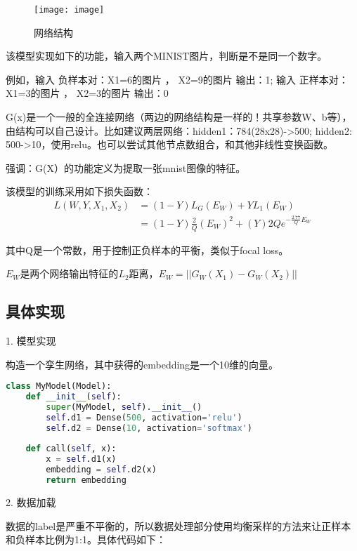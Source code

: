 \documentclass{article}
\begin{document}
		\begin{figure}[H]
			\centering
			\texttt{[image: image]}
			\caption{网络结构}
			\label{fig:image}
		\end{figure}
	
		该模型实现如下的功能，输入两个MINIST图片，判断是不是同一个数字。
		
		例如，输入  负样本对：X1=6的图片 ， X2=9的图片 输出：1;		
		输入  正样本对：X1=3的图片 ， X2=3的图片 输出：0
		
		G(x)是一个一般的全连接网络（两边的网络结构是一样的！共享参数W、b等），由结构可以自己设计。比如建议两层网络：hidden1：784(28x28)->500; hidden2: 500->10，使用relu。也可以尝试其他节点数组合，和其他非线性变换函数。
		
		强调：G(X）的功能定义为提取一张mnist图像的特征。
		
		该模型的训练采用如下损失函数：
		\begin{align*}
			L(W,Y,X_1,X_2) &= (1-Y)L_{G}(E_W)+YL_1(E_W) 
			\\
			&= (1-Y)\frac{2}{Q}(E_W)^2 + (Y)2Qe^{-\frac{2.77}{Q}E_W}
		\end{align*}
		
		其中Q是一个常数，用于控制正负样本的平衡，类似于focal loss。
		
		$E_W$是两个网络输出特征的$L_2$距离，$E_W=||G_W(X_1)-G_W(X_2)||$

	
	\subsection{具体实现}
	
	
	1. 模型实现
	
	  构造一个孪生网络，其中获得的embedding是一个10维的向量。
	
\begin{lstlisting}[language=Python]
class MyModel(Model):
	def __init__(self):
		super(MyModel, self).__init__()
		self.d1 = Dense(500, activation='relu')
		self.d2 = Dense(10, activation='softmax')
		
	def call(self, x):
		x = self.d1(x)
		embedding = self.d2(x)
		return embedding
\end{lstlisting}


  
  	2. 数据加载
  	
  	数据的label是严重不平衡的，所以数据处理部分使用均衡采样的方法来让正样本和负样本比例为1:1。具体代码如下：
  	
\end{document}
